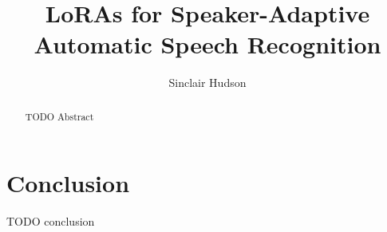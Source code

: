 \documentclass{article}
\title{LoRAs for Speaker-Adaptive Automatic Speech Recognition}
\author{Sinclair Hudson}
\begin{document}
\maketitle

\begin{abstract}
      TODO Abstract
\end{abstract}













\section{Conclusion}
TODO conclusion



\end{document}
